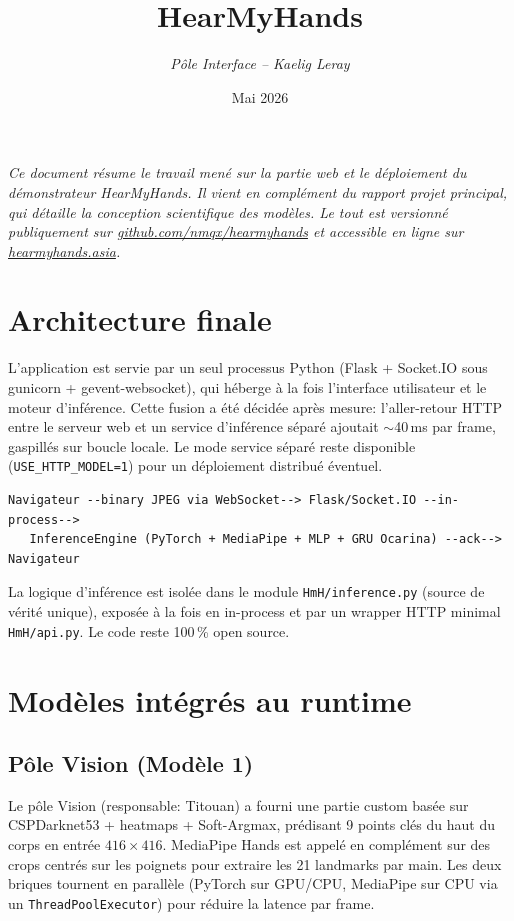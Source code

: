 \documentclass[11pt,a4paper]{article}
\title{\vspace{-1.5cm}\textbf{HearMyHands}\\[0.2em]
       \large\color{hmhblue}{Récap de l'intégration web, des optimisations et du déploiement}}
\author{\small\textit{Pôle Interface -- Kaelig Leray}}
\date{\small Mai 2026}
\begin{document}
\maketitle
\vspace{-1.5em}

\noindent\textit{Ce document résume le travail mené sur la partie web et le déploiement
du démonstrateur HearMyHands. Il vient en complément du rapport projet principal,
qui détaille la conception scientifique des modèles. Le tout est versionné publiquement
sur \href{https://github.com/nmqx/hearmyhands}{github.com/nmqx/hearmyhands} et accessible
en ligne sur \href{https://hearmyhands.asia}{hearmyhands.asia}.}

\section{Architecture finale}

\noindent L'application est servie par un seul processus Python (Flask + Socket.IO sous
gunicorn + gevent-websocket), qui héberge à la fois l'interface utilisateur et le moteur
d'inférence. Cette fusion a été décidée après mesure: l'aller-retour HTTP entre le
serveur web et un service d'inférence séparé ajoutait $\sim$40\,ms par frame, gaspillés
sur boucle locale. Le mode service séparé reste disponible (\texttt{USE\_HTTP\_MODEL=1})
pour un déploiement distribué éventuel.

\begin{verbatim}
Navigateur --binary JPEG via WebSocket--> Flask/Socket.IO --in-process-->
   InferenceEngine (PyTorch + MediaPipe + MLP + GRU Ocarina) --ack--> Navigateur
\end{verbatim}

La logique d'inférence est isolée dans le module \texttt{HmH/inference.py} (source de
vérité unique), exposée à la fois en in-process et par un wrapper HTTP minimal
\texttt{HmH/api.py}. Le code reste 100\,\% open source.

\section{Modèles intégrés au runtime}

\subsection{Pôle Vision (Modèle 1)}
Le pôle Vision (responsable: Titouan) a fourni une partie custom basée sur
CSPDarknet53 + heatmaps + Soft-Argmax, prédisant 9 points clés du haut du corps en
entrée $416\times416$. MediaPipe Hands est appelé en complément sur des crops centrés
sur les poignets pour extraire les 21 landmarks par main. Les deux briques tournent en
parallèle (PyTorch sur GPU/CPU, MediaPipe sur CPU via un \texttt{ThreadPoolExecutor})
pour réduire la latence par frame.
\end{document}
